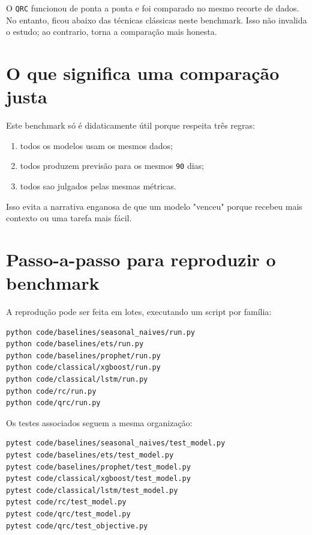 \documentclass[12pt]{article}
\providecommand{\tightlist}{%
              \setlength{\itemsep}{0pt}\setlength{\parskip}{0pt}}
\begin{document}
O \texttt{QRC} funcionou de ponta a ponta e foi comparado no mesmo recorte de dados. No entanto, ficou abaixo das técnicas clássicas neste benchmark. Isso não invalida o estudo; ao contrario, torna a comparação mais honesta.

\section{O que significa uma comparação justa}\label{7-o-que-significa-uma-comparauxe7uxe3o-justa}

Este benchmark só é didaticamente útil porque respeita três regras:

\begin{enumerate}
\def\labelenumi{\arabic{enumi}.}
\tightlist
\item
  todos os modelos usam os mesmos dados;
\item
  todos produzem previsão para os mesmos \texttt{90} dias;
\item
  todos sao julgados pelas mesmas métricas.
\end{enumerate}

Isso evita a narrativa enganosa de que um modelo "venceu" porque recebeu mais contexto ou uma tarefa mais fácil.

\section{Passo-a-passo para reproduzir o benchmark}\label{8-passo-a-passo-para-reproduzir-o-benchmark}

A reprodução pode ser feita em lotes, executando um script por família:

\begin{verbatim}
python code/baselines/seasonal_naives/run.py
python code/baselines/ets/run.py
python code/baselines/prophet/run.py
python code/classical/xgboost/run.py
python code/classical/lstm/run.py
python code/rc/run.py
python code/qrc/run.py
\end{verbatim}

Os testes associados seguem a mesma organização:

\begin{verbatim}
pytest code/baselines/seasonal_naives/test_model.py
pytest code/baselines/ets/test_model.py
pytest code/baselines/prophet/test_model.py
pytest code/classical/xgboost/test_model.py
pytest code/classical/lstm/test_model.py
pytest code/rc/test_model.py
pytest code/qrc/test_model.py
pytest code/qrc/test_objective.py
\end{verbatim}
\end{document}
